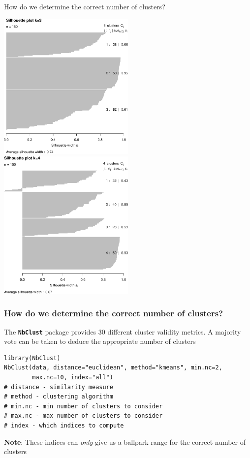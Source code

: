 \documentclass[pdf]{beamer}
\begin{document}
\begin{frame}{How do we determine the correct number of clusters?}
\begin{center}
	\includegraphics[width=0.5\textwidth]{silhK3.pdf}	
	\includegraphics[width=0.5\textwidth]{silhK4.pdf}
\end{center}
\end{frame}



\begin{frame}[fragile]
\frametitle{How do we determine the correct number of clusters?}
The \textbf{\texttt{NbClust}} package provides 30 different cluster validity metrics. A majority vote can be
taken to deduce the appropriate number of clusters
\vfill
\begin{lstlisting}[style=RCode]
library(NbClust)
NbClust(data, distance="euclidean", method="kmeans", min.nc=2, 
        max.nc=10, index="all")
# distance - similarity measure
# method - clustering algorithm
# min.nc - min number of clusters to consider
# max.nc - max number of clusters to consider
# index - which indices to compute
\end{lstlisting}
\vfill
\textbf{Note}: These indices can \textit{only} give us a ballpark range for the correct number of clusters
\end{frame}
\end{document}
